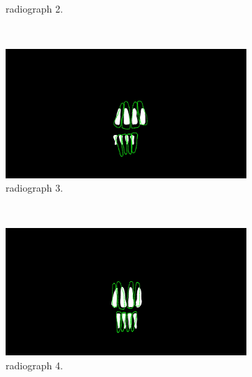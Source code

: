 \documentclass[a4paper,10pt]{article}
\begin{document}
\begin{figure}
\begin{subfigure}[b]{0.45\textwidth}
                \caption{ radiograph 2.}
                \label{fig:comp4}
        \end{subfigure}
        ~ %
        \begin{subfigure}[b]{0.45\textwidth}
                \includegraphics[width=\textwidth]{Images/segLand,3.jpg}
                \caption{ radiograph 3.}
                \label{fig:comp3}
        \end{subfigure}
        ~ %
        \begin{subfigure}[b]{0.45\textwidth}
                \includegraphics[width=\textwidth]{Images/segLand,4.jpg}
                \caption{ radiograph 4.}
                \label{fig:comp3}
        \end{subfigure}
        ~ %
        \begin{subfigure}[b]{0.45\textwidth}

\end{subfigure}
\end{figure}
\end{document}
